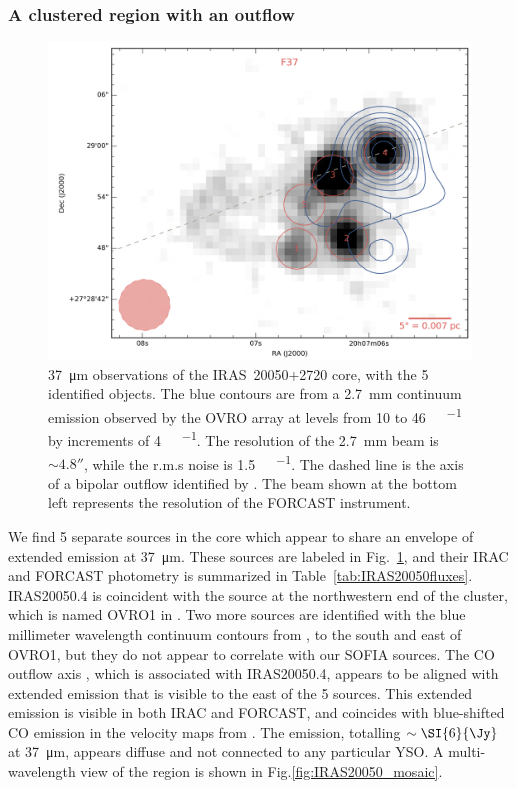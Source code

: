 \subsubsection{A clustered region with an outflow}

\begin{figure}
\begin{center}
\includegraphics[width=\textwidth]{Figures/IRAS20050_core.png}
\caption[IRAS~20050+2720 core]{\SI{37}{\um} observations of the IRAS~20050+2720 core, with the 5 identified objects. The blue contours are from a \SI{2.7}{\milli\meter} continuum emission observed by the OVRO array \citep{Beltran:2008gu} at levels from 10 to \SI{46}{\milli\Jy\per\beam} by increments of \SI{4}{\milli\Jy\per\beam}. The resolution of the \SI{2.7}{\milli\meter} beam is $\sim\ang{;;4.8}$, while the r.m.s noise is \SI{1.5}{\milli\Jy\per\beam}. The dashed line is the axis of a bipolar outflow identified by \citet{Bachiller:1995cy}. The beam shown at the bottom left represents the resolution of the FORCAST instrument.}
\label{fig:IRAS20050_core}
\end{center}
\end{figure}
We find 5 separate sources in the core which appear to share an envelope of extended emission at \SI{37}{\um}. These sources are labeled in Fig.~\ref{fig:IRAS20050_core}, and their IRAC and FORCAST photometry is summarized in Table~\ref{tab:IRAS20050fluxes}. IRAS20050.4 is coincident with the source at the northwestern end of the cluster, which is named OVRO1 in \citet{Beltran:2008gu}. Two more sources are identified with the blue millimeter wavelength continuum contours from \citet{Beltran:2008gu}, to the south and east of OVRO1, but they do not appear to correlate with our SOFIA sources. The CO outflow axis \citep[Outflow "A",][]{Bachiller:1995cy}, which is associated with IRAS20050.4, appears to be aligned with extended emission that is visible to the east of the 5 sources. This extended emission is visible in both IRAC and FORCAST, and coincides with blue-shifted CO emission in the velocity maps from \citet{Beltran:2008gu}. The emission, totalling $\sim\SI{6}{\Jy}$ at \SI{37}{\um}, appears diffuse and not connected to any particular YSO. A multi-wavelength view of the region is shown in Fig.\ref{fig:IRAS20050_mosaic}.

